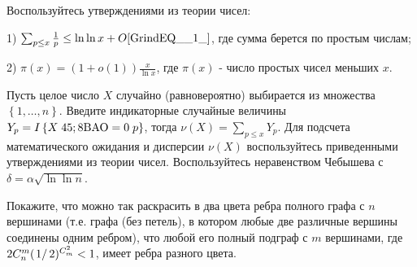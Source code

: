 \begin{ordre}

Воспользуйтесь утверждениями из теории чисел:

1) $\sum _{p\le x}\frac{1}{p}  \le \ln \ln x+O\eqref{GrindEQ__1_}$, где сумма берется по простым числам;

2) $\pi (x)=(1+o(1))\frac{x}{\ln x} $, где $\pi (x)$ - число простых чисел меньших $x$.

Пусть целое число $X$ случайно (равновероятно) выбирается из множества $\left\{1,\ldots ,n\right\}$. Введите индикаторные случайные величины $Y_{p} =I\left\{X\; {\rm 45;8BAO}\; {\rm =0}\; p\right\}$, тогда $\nu (X)=\sum _{p\le x}Y_{p}  $. Для подсчета математического ожидания и дисперсии $\nu (X)$ воспользуйтесь приведенными утверждениями из теории чисел. Воспользуйтесь неравенством Чебышева с $\delta =\alpha \sqrt{\ln \ln n} $.

\end{ordre}


\begin{problem}
Покажите, что можно так раскрасить в два цвета ребра полного графа с $n$ вершинами (т.е. графа (без петель), в котором любые две 
различные вершины соединены одним ребром), что любой его полный подграф с $m$ вершинами, где 
$2C_n^m (\left.1\right/2)^{C_m^2}<1$, имеет ребра разного цвета. 
\end{problem}

